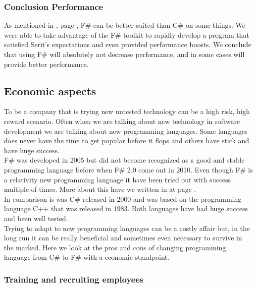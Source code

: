 \documentclass[12pt, a4paper]{article}
\begin{document}
\subsubsection{Conclusion Performance}
As mentioned in , page \pageref{sTranslatePerformance}, F\# can be better suited than C\# on some things. We were able to take advantage of the F\# toolkit to rapidly develop a program that satisfied Serit's expectations and even provided performance boosts. We conclude that using F\# will absolutely not decrease performance, and in some cases will provide better performance.

\newpage

\subsection{Economic aspects}

To be a company that is trying new untested technology can be a high risk, high reward scenario. Often when we are talking about new technology in software development we are talking about new programming languages. Some languages does never have the time to get popular before it flops and others have stick and have huge success.\\

F\# was developed in 2005 but did not become recognized as a good and stable programming language before when F\# 2.0 come out in 2010. Even though F\# is a relativity new programming language it have been tried out with success multiple of times. More about this have we written in  at page \pageref{Testimonials}.\\

In comparison is was C\# released in 2000 and was based on the programming language C++ that was released in 1983. Both languages have had huge success and been well tested.\\

Trying to adapt to new programming languages can be a costly affair but, in the long run it can be really beneficial and sometimes even necessary to survive in the marked. Here we look at the pros and cons of changing programming language from C\# to F\# with a economic standpoint.

\newpage
\subsubsection{Training and recruiting employees}
\end{document}

